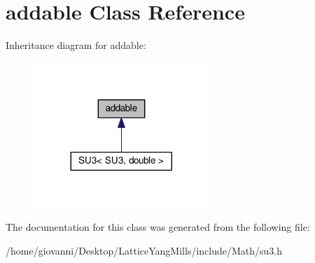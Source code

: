 \hypertarget{classtao_1_1operators_1_1addable}{}\section{addable Class Reference}
\label{classtao_1_1operators_1_1addable}


Inheritance diagram for addable\+:\nopagebreak
\begin{figure}[H]
\begin{center}
\leavevmode
\includegraphics[width=188pt]{classtao_1_1operators_1_1addable__inherit__graph}
\end{center}
\end{figure}


The documentation for this class was generated from the following file\+:\begin{DoxyCompactItemize}
\item 
/home/giovanni/\+Desktop/\+Lattice\+Yang\+Mills/include/\+Math/su3.\+h\end{DoxyCompactItemize}
